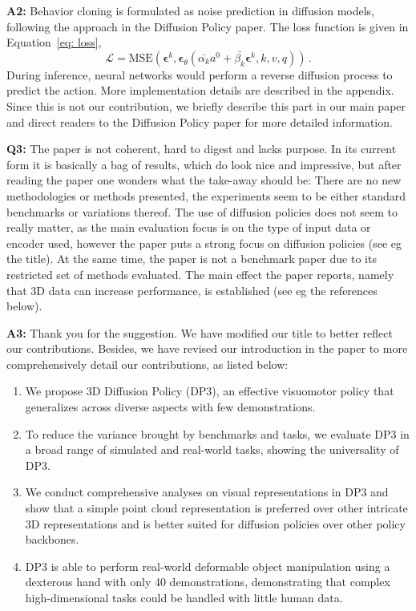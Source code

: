 \noindent\textbf{A2:} 
Behavior cloning is formulated as noise prediction in diffusion models, following the approach in the Diffusion Policy paper. The loss function is given in Equation~\ref{eq: loss},
$$
\mathcal{L}=\text{MSE}\left(\boldsymbol{\epsilon}^k, \boldsymbol{\epsilon}_\theta(\bar{\alpha_k} a^0 + \bar{\beta_k} \boldsymbol{\epsilon}^k, k, v, q)\right)\,.
$$
During inference, neural networks would perform a reverse diffusion process to predict the action. More implementation details are described in the appendix. Since this is not our contribution, we briefly describe this part in our main paper and direct readers to the Diffusion Policy paper for more detailed information. 

\vspace{0.1in}

\noindent\textbf{Q3:} The paper is not coherent, hard to digest and lacks purpose. In its current form it is basically a bag of results, which do look nice and impressive, but after reading the paper one wonders what the take-away should be: There are no new methodologies or methods presented, the experiments seem to be either standard benchmarks or variations thereof. The use of diffusion policies does not seem to really matter, as the main evaluation focus is on the type of input data or encoder used, however the paper puts a strong focus on diffusion policies (see eg the title). At the same time, the paper is not a benchmark paper due to its restricted set of methods evaluated. The main effect the paper reports, namely that 3D data can increase performance, is established (see eg the references below).

\noindent\textbf{A3:}  Thank you for the suggestion. We have modified our title to better reflect our contributions. Besides, we have revised our introduction in the paper to more comprehensively detail our contributions, as listed below:
\begin{enumerate}
    \item We propose 3D Diffusion Policy (DP3), an effective visuomotor policy that generalizes across diverse aspects with few demonstrations.
    \item To reduce the variance brought by benchmarks and tasks, we evaluate DP3 in a broad range of simulated and real-world tasks, showing the universality of DP3.
    \item We conduct comprehensive analyses on visual representations in DP3 and show that a simple point cloud representation is preferred over other intricate 3D representations and is better suited for diffusion policies over other policy backbones.
    \item DP3 is able to perform real-world deformable object manipulation using a dexterous hand with only 40 demonstrations, demonstrating that complex high-dimensional tasks could be handled with little human data.
\end{enumerate}


